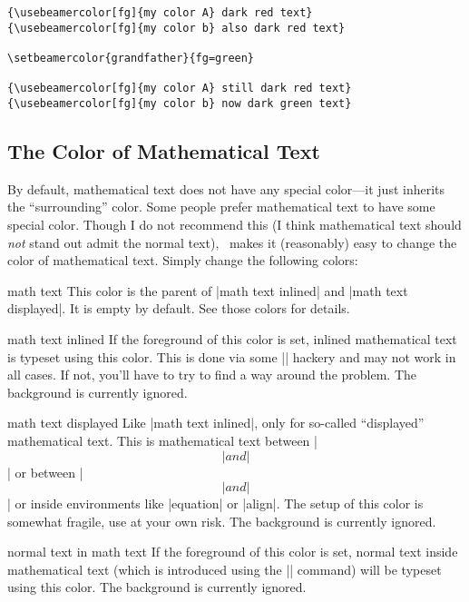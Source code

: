 \begin{command}{\setbeamercolor\opt{|*|}}
\begin{itemize}
\begin{verbatim}
{\usebeamercolor[fg]{my color A} dark red text}
{\usebeamercolor[fg]{my color b} also dark red text}

\setbeamercolor{grandfather}{fg=green}

{\usebeamercolor[fg]{my color A} still dark red text}
{\usebeamercolor[fg]{my color b} now dark green text}
\end{verbatim}
  \end{itemize}
\end{command}



  
\subsection{The Color of Mathematical Text}

By default, mathematical text does not have any special color---it
just inherits the ``surrounding'' color. Some people prefer
mathematical text to have some special color. Though I do not
recommend this (I think mathematical text should \emph{not} stand out
admit the normal text), \beamer\ makes it (reasonably) easy to change
the color of mathematical text. Simply change the following colors:

\begin{element}{math text}\no\yes\no
  This color is the parent of |math text inlined| and
  |math text displayed|. It is empty by default. See those colors for
  details. 
\end{element}

\begin{element}{math text inlined}\no\yes\no
  If the foreground of this color is set, inlined mathematical text is
  typeset using this color. This is done via some |\everymath| hackery
  and may not work in all cases. If not, you'll have to try to find a
  way around the problem. The background is currently
  ignored. 
\end{element}

\begin{element}{math text displayed}\no\yes\no
  Like |math text inlined|, only for so-called ``displayed''
  mathematical text. This is mathematical text between |\[| and |\]| or
  between |$$| and |$$| or inside environments like |equation| or
  |align|. The setup of this color is somewhat fragile, use at your
  own risk. The background is currently
  ignored.   
\end{element}

\begin{element}{normal text in math text}\no\yes\no
  If the foreground of this color is set, normal text inside
  mathematical text (which is introduced using the |\text| command)
  will be typeset using this color. The background is currently
  ignored. 
\end{element}



